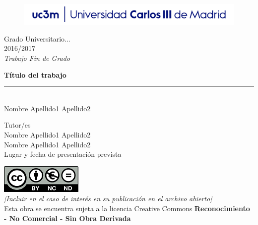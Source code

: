 \documentclass[a4paper,12pt]{article}
\begin{document}
\begin{titlepage}
\begin{sffamily}
\color{azulUC3M}
\begin{center}
\begin{figure}[htb]
\begin{center}
\vspace*{0.6cm}
\includegraphics[width=15cm]{imagenes/Portada_Logo.png}
\vspace*{1.6cm}
\end{center}
\end{figure}
\begin{LARGE}
Grado Universitario... \\%
2016/2017 \\%
\vspace*{2cm}
\textsl{Trabajo Fin de Grado}\\
\end{LARGE}

\begin{huge}
\textbf{Título del trabajo} \\
\rule{80mm}{0.1mm}\\
\vspace*{1cm}
Nombre Apellido1 Apellido2\\ %
\end{huge}

\vspace*{1cm}
\begin{Large}
Tutor/es\\
Nombre Apellido1 Apellido2\\
Nombre Apellido1 Apellido2\\
Lugar y fecha de presentación prevista\\
\end{Large}
\end{center}
\vspace*{3cm}
\color{black}
\includegraphics{imagenes/creativecommons.png}\\
\emph{[Incluir en el caso de interés en su publicación en el archivo abierto]}\\
Esta obra se encuentra sujeta a la licencia Creative Commons \textbf{Reconocimiento - No Comercial - Sin Obra Derivada}

\end{sffamily}
\end{titlepage}
\end{document}
